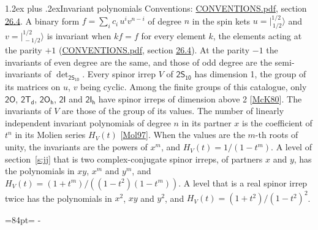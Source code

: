 \documentclass[10pt,a4paper]{article}
\makeatletter
\renewcommand\section{\@startsection{section}{1}{\z@}{-3ex plus -1ex minus -.2ex}%
  {1.2ex plus .2ex}{\normalfont\large\sffamily\bfseries\color{parttitle}}}
\newcommand{\needspace}[1]{\par\penalty-100\begingroup\dimen0=#1\relax\dimen2=\pagegoal
  \advance\dimen2-\pagetotal\ifdim\dimen0>\dimen2\relax\ifdim\dimen2>0pt\vfil\break\fi\fi
  \endgroup}
\numberwithin{equation}{section}
\newcommand{\grp}[1]{\mathsf{#1}}
\newcommand{\jm}[2]{\bigl\lvert{}^{#1}_{\,#2}\bigr\rangle}
\makeatother
\begin{document}
\section{Invariant polynomials}\label{s:invariants}
Conventions: \href{../../CONVENTIONS.pdf}{CONVENTIONS.pdf}, section \href{../../CONVENTIONS.pdf\#conv.26.4}{26.4}.
\leavevmode\label{n:local.binary.form}A binary form $f = \sum_i c_i\, u^i v^{n-i}$ of degree $n$ in the spin kets $u = \jm{1/2}{1/2}$ and $v = \jm{1/2}{-1/2}$ is invariant when $k f = f$ for every element $k$, the elements acting at the parity $+1$ (\href{../../CONVENTIONS.pdf}{CONVENTIONS.pdf}, section \href{../../CONVENTIONS.pdf\#conv.26.4}{26.4}). At the parity $-1$ the invariants of even degree are the same, and those of odd degree are the semi-invariants of $\det_{\grp{2S_{10}}}$.
\leavevmode\label{n:function.hilbert}Every spinor irrep $V$ of $\grp{2S_{10}}$ has dimension 1, the group of its matrices on $u$, $v$ being cyclic. Among the finite groups of this catalogue, only $\grp{2O}$, $\grp{2T_{d}}$, $\grp{2O_{h}}$, $\grp{2I}$ and $\grp{2I_{h}}$ have spinor irreps of dimension above 2 [\href{../../../REFERENCES.pdf\#ref.McK80}{McK80}]. The invariants of $V$ are those of the group of its values. \label{n:local.partner.x}The number of linearly independent invariant polynomials of degree $n$ in its partner $x$ is the coefficient of $t^n$ in its Molien series $H_V(t)$ [\href{../../../REFERENCES.pdf\#ref.Mol97}{Mol97}]. When the values are the $m$-th roots of unity, the invariants are the powers of $x^{m}$, and $H_V(t) = 1/(1 - t^{m})$. A level of section~\ref{s:jj} that is two complex-conjugate spinor irreps, of partners $x$ and $y$, has the polynomials in $xy$, $x^{m}$ and $y^{m}$, and $H_V(t) = (1 + t^{m})/((1 - t^{2})(1 - t^{m}))$. A level that is a real spinor irrep twice has the polynomials in $x^{2}$, $xy$ and $y^{2}$, and $H_V(t) = (1 + t^{2})/(1 - t^{2})^{2}$.
\needspace{84pt}
\end{document}
